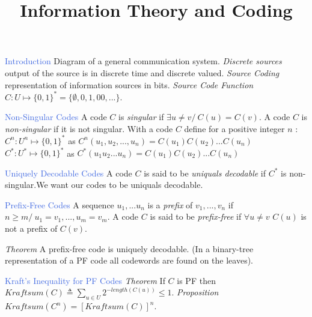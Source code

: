 \documentclass[10pt,a4paper,landscape]{article}
\newcommand{\concept}[1]{\textcolor{RoyalBlue}{#1}}
\newcommand{\subconcept}[1]{\textcolor{PineGreen}{\textit{#1}}}
\newcommand{\opt}[1]{#1}
\renewcommand{\opt}[1]{}
\renewcommand{\section}[1]{
    \vspace{-0.3cm}
    \begin{center}
      \color{Bittersweet}
      \hrulefill{\small~~#1~~}\hrulefill
    \end{center}
    \vspace{-0.3cm}
  }
\begin{document}
\title{Information Theory and Coding}

\raggedright
\footnotesize
\sffamily
\begin{multicols*}{4}

\setlength{\premulticols}{1pt}
\setlength{\postmulticols}{1pt}
\setlength{\multicolsep}{1pt}
\setlength{\columnsep}{2pt}

\opt {
  \begin{center}
  \Large{Information Theory and Coding}
  \end{center}
}

\section{Source Coding}

\concept{Introduction}
Diagram of a general communication system.
\subconcept{Discrete sources} output of the source is in discrete time and discrete valued.
\subconcept{Source Coding} representation of information sources in bits.
\subconcept{Source Code Function} $C:U\mapsto\{0,1\}^*=\{\emptyset,0,1,00,...\}$.

\concept{Non-Singular Codes} 
A code $C$ is \subconcept{singular} if $\exists u \neq v /\ C(u)=C(v)$. A code $C$ is \subconcept{non-singular} if it is not singular.
With a code $C$ define for a positive integer $n$ :
$C^n:U^n\mapsto\{0,1\}^*$ as $C^n(u_1,u_2,...,u_n)=C(u_1)C(u_2)...C(u_n)$
$C^*:U^*\mapsto\{0,1\}^*$ as $C^*(u_1u_2...u_n)=C(u_1)C(u_2)...C(u_n)$

\concept{Uniquely Decodable Codes}
A code $C$ is said to be \subconcept{uniquals decodable} if $C^*$ is non-singular.We want our codes to be uniquals decodable.

\concept{Prefix-Free Codes} 
A sequence $u_1,... u_n$ is a \subconcept{prefix} of $v_1,...,v_n$ if $n \geqslant m /\ u_1=v_1,...,u_m=v_m$.
A code $C$ is said to be \subconcept{prefix-free} if $\forall u \neq v$ $C(u)$ is not a prefix of $C(v)$.

\subconcept{Theorem} A prefix-free code is uniquely decodable.
(In a binary-tree representation of a PF code all codewords are found on the leaves).

\concept{Kraft's Inequality for PF Codes} 
\subconcept{Theorem}
If $C$ is PF then 
$Kraftsum(C) \triangleq \sum_{u \in U }2^{-length(C(u))} \le 1$.
\subconcept{Proposition} $Kraftsum(C^n)=\left[ Kraftsum(C) \right]^n$.


\end{multicols*}
\end{document}
